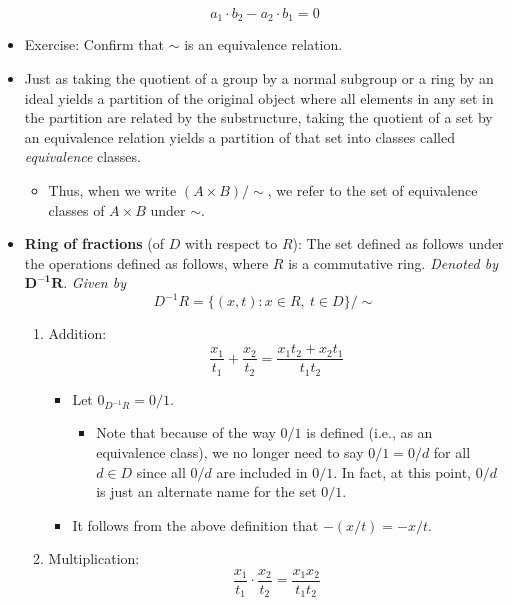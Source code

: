\documentclass[../notes.tex]{subfiles}
\begin{document}
\begin{itemize}
\begin{equation*}
        a_1\cdot b_2-a_2\cdot b_1 = 0
    \end{equation*}
    \item Exercise: Confirm that $\sim$ is an equivalence relation.
    \item Just as taking the quotient of a group by a normal subgroup or a ring by an ideal yields a partition of the original object where all elements in any set in the partition are related by the substructure, taking the quotient of a set by an equivalence relation yields a partition of that set into classes called \emph{equivalence} classes.
    \begin{itemize}
        \item Thus, when we write $(A\times B)/\sim$, we refer to the set of equivalence classes of $A\times B$ under $\sim$.
    \end{itemize}
    \item \textbf{Ring of fractions} (of $D$ with respect to $R$): The set defined as follows under the operations defined as follows, where $R$ is a commutative ring. \emph{Denoted by} $\bm{D^{-1}R}$. \emph{Given by}
    \begin{equation*}
        D^{-1}R = \{(x,t):x\in R,\ t\in D\}/\sim
    \end{equation*}
    \begin{enumerate}
        \item Addition:
        \begin{equation*}
            \frac{x_1}{t_1}+\frac{x_2}{t_2} = \frac{x_1t_2+x_2t_1}{t_1t_2}
        \end{equation*}
        \begin{itemize}
            \item Let $0_{D^{-1}R}=0/1$.
            \begin{itemize}
                \item Note that because of the way $0/1$ is defined (i.e., as an equivalence class), we no longer need to say $0/1=0/d$ for all $d\in D$ since all $0/d$ are included in $0/1$. In fact, at this point, $0/d$ is just an alternate name for the set $0/1$.
            \end{itemize}
            \item It follows from the above definition that $-(x/t)=-x/t$.
        \end{itemize}
        \item Multiplication:
        \begin{equation*}
            \frac{x_1}{t_1}\cdot\frac{x_2}{t_2} = \frac{x_1x_2}{t_1t_2}

\end{equation*}
\end{enumerate}
\end{itemize}
\end{document}
